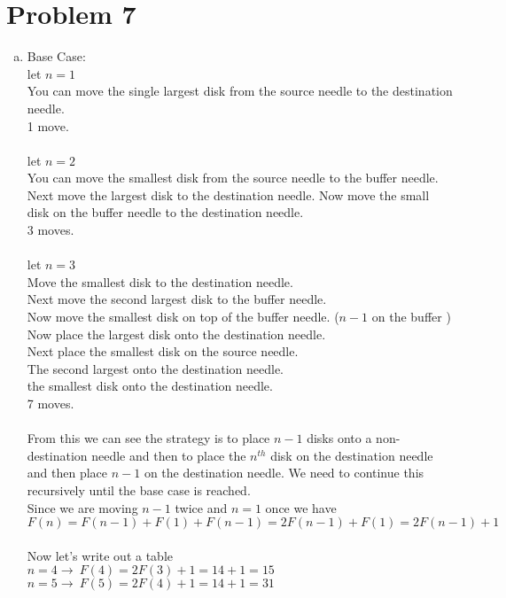 \documentclass[11pt,letterpaper]{article}
\begin{document}
\section*{Problem 7}
\begin{enumerate}[(a)]
\item
Base Case:\\
let $n = 1$\\
You can move the single largest disk from the source needle to the destination needle.\\
1 move.\\
\\
let $n = 2$\\
You can move the smallest disk from the source needle to the buffer needle.
Next move the largest disk to the destination needle.
Now move the small disk on the buffer needle to the destination needle.\\
3 moves.\\
\\
let $n = 3$\\
Move the smallest disk to the destination needle.\\
Next move the second largest disk to the buffer needle. \\
Now move the smallest disk on top of the buffer needle. ($n-1$ on the buffer )\\
Now place the largest disk onto the destination needle.\\
Next place the smallest disk on the source needle.\\
The second largest onto the destination needle.\\
the smallest disk onto the destination needle.\\
7 moves.\\\\
From this we can see the strategy is to place $n-1$ disks onto a non-destination needle and then to place the $n^{th}$ disk on the destination needle and then place $n-1$ on the destination needle. We need to continue this recursively until the base case is reached.\\
Since we are moving $n-1$ twice and $n=1$ once we have\\
$F(n) = F(n-1) + F(1)+ F(n-1) = 2F(n-1) + F(1) = 2F(n-1) + 1$\\
\\
Now let's write out a table\\
$n=4\rightarrow~F(4) = 2F(3) + 1 = 14+1=15$\\
$n=5\rightarrow~F(5) = 2F(4) + 1 = 14+1=31$\\

\end{enumerate}
\end{document}
